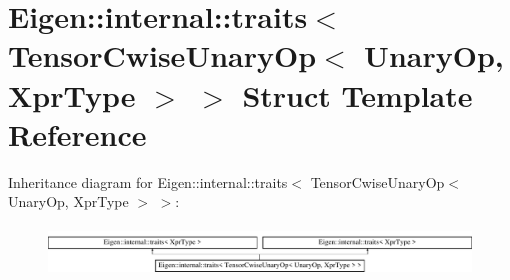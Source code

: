 \hypertarget{struct_eigen_1_1internal_1_1traits_3_01_tensor_cwise_unary_op_3_01_unary_op_00_01_xpr_type_01_4_01_4}{}\section{Eigen\+:\+:internal\+:\+:traits$<$ Tensor\+Cwise\+Unary\+Op$<$ Unary\+Op, Xpr\+Type $>$ $>$ Struct Template Reference}
\label{struct_eigen_1_1internal_1_1traits_3_01_tensor_cwise_unary_op_3_01_unary_op_00_01_xpr_type_01_4_01_4}
Inheritance diagram for Eigen\+:\+:internal\+:\+:traits$<$ Tensor\+Cwise\+Unary\+Op$<$ Unary\+Op, Xpr\+Type $>$ $>$\+:\begin{figure}[H]
\begin{center}
\leavevmode
\includegraphics[height=1.352657cm]{struct_eigen_1_1internal_1_1traits_3_01_tensor_cwise_unary_op_3_01_unary_op_00_01_xpr_type_01_4_01_4}
\end{center}
\end{figure}
